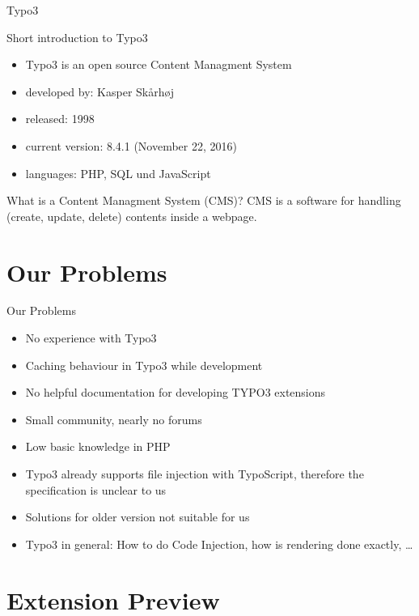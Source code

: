\documentclass{beamer}
\begin{document}
\begin{frame}{Typo3}
\begin{block}{Short introduction to Typo3}
\begin{itemize}
\item Typo3 is an open source Content Managment System
\item developed by: Kasper Skårhøj
\item released: 1998
\item current version: 8.4.1 (November 22, 2016)
\item languages: PHP, SQL und JavaScript
\end{itemize}
\end{block}
\begin{block}{What is a Content Managment System (CMS)?}
CMS is a software for handling (create, update, delete) contents inside a webpage.
\end{block}

\end{frame}


\section{Our Problems}

\begin{frame}{Our Problems}
\begin{itemize}
\item No experience with Typo3
\item Caching behaviour in Typo3 while development
\item No helpful documentation for developing TYPO3 extensions
\item Small community, nearly no forums
\item Low basic knowledge in PHP
\item Typo3 already supports file injection with TypoScript, therefore the specification is unclear to us
\item Solutions for older version not suitable for us
\item Typo3 in general: How to do Code Injection, how is rendering done exactly, \dots
\end{itemize}
\end{frame}


\section{Extension Preview}
\end{document}
